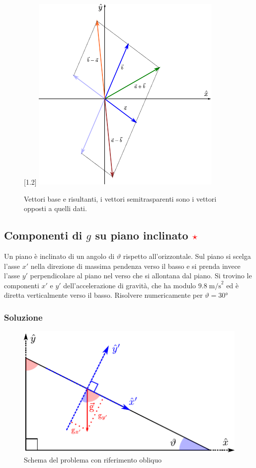 \documentclass[12pt,a4paper]{book}
\newcommand{\rstar}{ \textcolor{red}{$\star$}}
\begin{document}
\begin{figure}[h]
 \centering
\scalebox{1.5}[1.2]
	{\includegraphics{vec_op.pdf}}
 \caption{Vettori base e risultanti, i vettori semitrasparenti sono i vettori opposti a quelli dati.}
 \label{fig:vec_op}
\end{figure}

\pagebreak

\subsection{Componenti di $g$ su piano inclinato \rstar}
\label{subsec:incline}
Un piano è inclinato di un angolo di $\vartheta$ rispetto all'orizzontale. Sul piano si scelga l'asse $x'$ nella direzione di massima pendenza verso il basso e si prenda invece l'asse $y'$ perpendicolare al piano nel verso che si allontana dal piano. Si trovino le componenti $x'$ e $y'$ dell'accelerazione di gravità, che ha modulo $9.8\;\text{m/s}^2$ ed è diretta verticalmente verso il basso. Risolvere numericamente per $\vartheta = 30$°
\subsubsection*{Soluzione}

\begin{figure}[h]
 \centering
\includegraphics[scale=1.3]{drawing.pdf}
 \caption{Schema del problema con riferimento obliquo}
 \label{figure:incline_g}
\end{figure}
\end{document}
